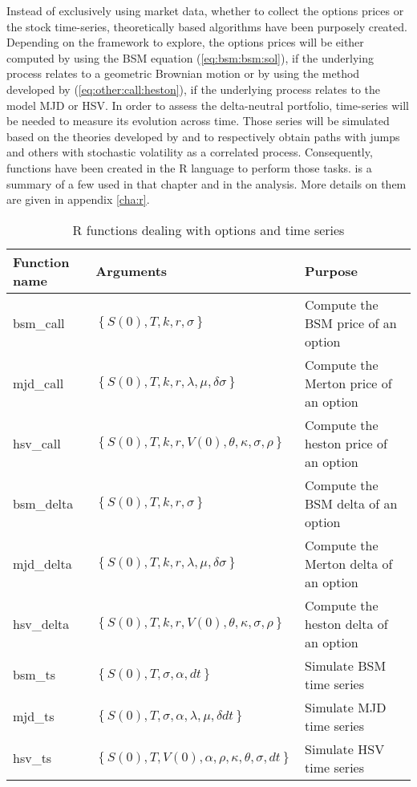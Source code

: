 \documentclass[12pt]{report}
\begin{document}
Instead of exclusively using market data, whether to collect the options prices or the stock time-series, theoretically based algorithms have been purposely created.
Depending on the framework to explore, the options prices will be either computed by using the BSM equation (\cref{eq:bsm:bsm:sol}), if the underlying process relates to a geometric Brownian motion or by using the method developed by \citet{heston1993} (\cref{eq:other:call:heston}), if the underlying process relates to the model MJD or HSV.
In order to assess the delta-neutral portfolio, 
time-series will be needed to measure its evolution across time.
Those series will be simulated based on the theories developed by \citet{merton76} and \citet{heston1993} to respectively obtain paths with jumps and others with stochastic volatility as a correlated process.
Consequently,  functions have been created in the R language to perform those tasks.  is a summary of a few used in that chapter and in the analysis. More details on them are given in appendix \cref{cha:r}.

\begin{table}[ht]
  \begin{tabularx}{\textwidth}{llX}
    \hline
    Function name & Arguments & Purpose \\
    \hline
    bsm\_call & $\left \{ S(0), T, k, r, \sigma \right \}$ & Compute the BSM price of an option \\
    mjd\_call & $\left \{ S(0), T, k, r, \lambda, \mu, \delta \sigma \right \}$ & Compute the Merton price of an option \\
    hsv\_call & $\left \{ S(0), T, k, r, V(0), \theta, \kappa, \sigma, \rho \right \}$ & Compute the heston price of an option \\
    bsm\_delta & $\left \{ S(0), T, k, r, \sigma \right \}$ & Compute the BSM delta of an option \\
    mjd\_delta & $\left \{ S(0), T, k, r, \lambda, \mu, \delta \sigma \right \}$ & Compute the Merton delta of an option \\
    hsv\_delta & $\left \{ S(0), T, k, r, V(0), \theta, \kappa, \sigma, \rho \right \}$ & Compute the heston delta of an option \\
    bsm\_ts & $\left \{ S(0), T, \sigma, \alpha, dt \right \}$ & Simulate BSM time series \\
    mjd\_ts & $\left \{ S(0), T, \sigma, \alpha, \lambda, \mu, \delta dt \right \}$ & Simulate MJD time series \\
    hsv\_ts & $\left \{ S(0), T, V(0), \alpha, \rho, \kappa, \theta, \sigma, dt \right \}$ & Simulate HSV time series \\
  \end{tabularx}
  \caption{R functions dealing with options and time series}
  \label{t:methodology:r}
\end{table}
\end{document}
